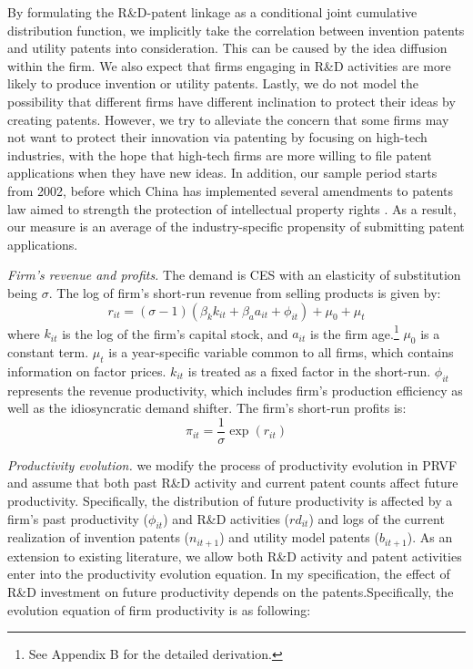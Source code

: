 \documentclass[11pt]{article}
\begin{document}
By formulating the R\&D-patent linkage as a conditional joint cumulative distribution function, we implicitly take the correlation between invention patents and utility patents into consideration. This can be caused by the idea diffusion within the firm. We also expect that firms engaging in R\&D activities are more likely to produce invention or utility patents. Lastly, we do not model the possibility that different firms have different inclination to protect their ideas by creating patents. However, we try to alleviate the concern that some firms may not want to protect their innovation via patenting by focusing on high-tech industries, with the hope that high-tech firms are more willing to file patent applications when they have new ideas. In addition, our sample period starts from 2002, before which China has implemented several amendments to patents law aimed to strength the protection of intellectual property rights \citep{Hu2009}. As a result, our measure is an average of the industry-specific propensity of submitting patent applications.

\textit{Firm's revenue and profits.} The demand is CES with an elasticity of substitution being $\sigma$. The log of firm's short-run revenue from selling products is given by:
\begin{equation} \label{log-rev}
    r_{it} =(\sigma-1)(\beta_k k_{it}+\beta_aa_{it}+\phi_{it}) +\mu_0+\mu_t
\end{equation}
where $k_{it}$ is the log of the firm's capital stock, and $a_{it}$ is the firm age.\footnote{See Appendix B for the detailed derivation.} $\mu_0$ is a constant term. $\mu_t$ is a year-specific variable common to all firms, which contains information on factor prices. $k_{it}$ is treated as a fixed factor in the short-run. $\phi_{it}$ represents the revenue productivity, which includes firm's production efficiency as well as the idiosyncratic demand shifter. The firm's short-run profits is:
\begin{equation}
    \pi_{it} = \frac{1}{\sigma}\exp(r_{it})
\end{equation}

\textit{Productivity evolution.} we modify the process of productivity evolution in PRVF and assume that both past R\&D activity and current patent counts affect future productivity. Specifically, the distribution of future productivity is affected by a firm’s past productivity ($\phi_{it}$) and R\&D activities ($rd_{it}$) and logs of the current realization of invention patents ($n_{it+1}$) and utility model patents ($b_{it+1}$). As an extension to existing literature, we allow both R\&D activity and patent activities enter into the productivity evolution equation. In my specification, the effect of R\&D investment on future productivity depends on the patents.Specifically, the evolution equation of firm productivity is as
following:
\end{document}
